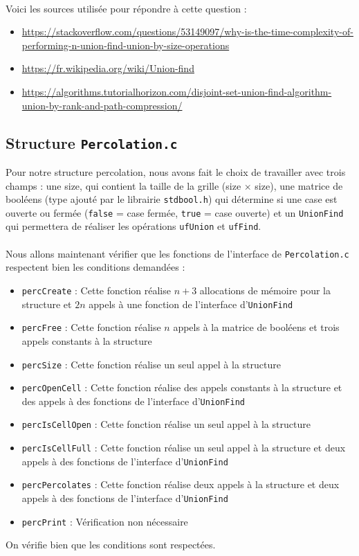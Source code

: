 \documentclass[12pt]{article}
\begin{document}
\paragraph{}
Voici les sources utilisée pour répondre à cette question :

\begin{itemize}
	\item \url{https://stackoverflow.com/questions/53149097/why-is-the-time-complexity-of-performing-n-union-find-union-by-size-operations}
	\item \url{https://fr.wikipedia.org/wiki/Union-find}
	\item \url{https://algorithms.tutorialhorizon.com/disjoint-set-union-find-algorithm-union-by-rank-and-path-compression/}
\end{itemize}

\subsection{Structure \texttt{Percolation.c}}
Pour notre structure percolation, nous avons fait le choix de travailler avec trois champs : une size, qui contient la taille de la grille 
(size $\times$ size), une matrice de booléens (type ajouté par le librairie \texttt{stdbool.h}) qui détermine si une case est ouverte ou fermée 
(\texttt{false} = case fermée, \texttt{true} = case ouverte) et un \texttt{UnionFind} qui permettera de réaliser les opérations \texttt{ufUnion} et \texttt{ufFind}.
\paragraph{}
Nous allons maintenant vérifier que les fonctions de l'interface de \texttt{Percolation.c} respectent bien les conditions demandées :
\begin{itemize}
	\item \texttt{percCreate} : Cette fonction réalise $n + 3$ allocations de mémoire pour la structure et $2n$ appels à une fonction de l'interface d'\texttt{UnionFind}
	\item \texttt{percFree} : Cette fonction réalise $n$ appels à la matrice de booléens et trois appels constants à la structure
	\item \texttt{percSize} : Cette fonction réalise un seul appel à la structure
	\item \texttt{percOpenCell} : Cette fonction réalise des appels constants à la structure et des appels à des fonctions de l'interface d'\texttt{UnionFind}
	\item \texttt{percIsCellOpen} : Cette fonction réalise un seul appel à la structure
	\item \texttt{percIsCellFull} : Cette fonction réalise un seul appel à la structure et deux appels à des fonctions de l'interface d'\texttt{UnionFind}
	\item \texttt{percPercolates} : Cette fonction réalise deux appels à la structure et deux appels à des fonctions de l'interface d'\texttt{UnionFind}
	\item \texttt{percPrint} : Vérification non nécessaire
\end{itemize}
\vspace{0.5cm}
On vérifie bien que les conditions sont respectées.
\end{document}
